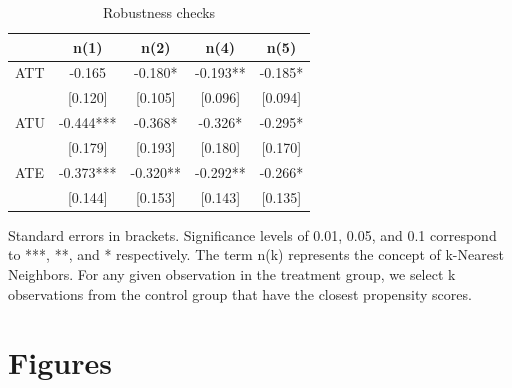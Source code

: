 \documentclass[12pt]{article}
\renewcommand{\arraystretch}{1.0} %
\begin{document}
\begin{table}[htbp]
\renewcommand{\arraystretch}{0.85}
\setlength{\tabcolsep}{3mm}
  \centering
  \caption{Robustness checks}
  \label{rob}
{\small
    \begin{tabular}{lcccc}
    \toprule
     & n(1) & n(2) & n(4) & n(5) \\ 
    \midrule \midrule
    ATT & -0.165 & -0.180* & -0.193** & -0.185* \\ 
    & [0.120] & [0.105] & [0.096] & [0.094] \\ 
    \midrule 
    ATU & -0.444*** & -0.368* & -0.326* & -0.295* \\ 
    & [0.179] & [0.193] & [0.180] & [0.170] \\ 
    \midrule
    ATE & -0.373*** & -0.320** & -0.292** & -0.266* \\ 
    & [0.144] & [0.153] & [0.143] & [0.135] \\ 
    \bottomrule
    \end{tabular}
}
\end{table}
\vspace{-2em}
\begin{singlespace}
    \begin{footnotesize}
    	 Standard errors in brackets. Significance levels of 0.01, 0.05, and 0.1 correspond to ***, **, and * respectively. The term n(k) represents the concept of k-Nearest Neighbors. For any given observation in the treatment group, we select k observations from the control group that have the closest propensity scores.
    \end{footnotesize}
\end{singlespace}




\section*{Figures}
\end{document}
